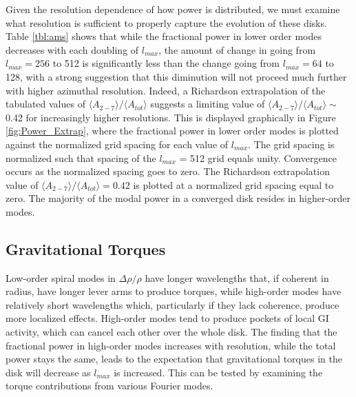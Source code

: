 \documentclass[manuscript]{aastex}
\begin{document}
Given the resolution dependence of how power is distributed,  we must examine what resolution is sufficient to properly capture the evolution of these disks. Table \ref{tbl:ams} shows that while the fractional power in lower order modes decreases with each doubling of $l_{max}$, the amount of change in going from $l_{max} = 256$ to 512 
is significantly less than the change going from $l_{max} = 64$ to 128, with a strong suggestion that this diminution will not proceed much further with higher azimuthal resolution. Indeed, a  Richardson extrapolation \citep{press1992} of the tabulated values of  $\langle A_{2-7} \rangle / \langle A_{tot} \rangle$ suggests a limiting value of  $\langle A_{2-7} \rangle / \langle A_{tot} \rangle \sim$ 0.42 for increasingly higher resolutions. This is displayed graphically in Figure \ref{fig:Power_Extrap}, where the fractional power in lower order modes is plotted against the  normalized grid 
spacing for each value of $l_{max}$. The grid spacing  is normalized such that spacing of the $l_{max}$ = 512 grid
equals unity.  Convergence occurs as the normalized spacing goes to zero. The Richardson extrapolation value  of $\langle A_{2-7}\rangle  / \langle A_{tot}\rangle  = 0.42$ is plotted at a normalized grid spacing  equal to zero. The majority of the modal power in a converged disk resides in higher-order modes. 

\subsection{Gravitational Torques}

Low-order spiral modes in $\Delta\rho / \rho$  have longer wavelengths that, if coherent in radius, have longer lever 
arms to produce torques, while high-order modes have relatively short wavelengths which, particularly if they 
lack coherence, produce more localized effects. High-order modes tend to produce pockets of local GI activity, 
which can cancel each other over the whole disk.  The finding that the fractional power in high-order modes increases
with resolution, while the total power stays the same, leads to
 the expectation that  gravitational torques in the disk will decrease as $l_{max}$ is increased. This can be tested by examining the torque contributions from  various Fourier modes.
\end{document}
